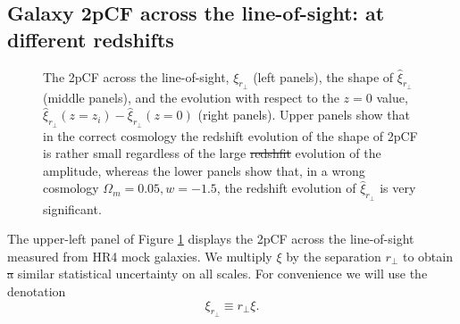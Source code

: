 \documentclass[iop]{emulateapj}
\providecommand{\DIFadd}[1]{{\protect\color{blue}\uwave{#1}}} %
\providecommand{\DIFdel}[1]{{\protect\color{red}\sout{#1}}}                      %
\providecommand{\DIFdelbegin}{} %
\providecommand{\DIFdelend}{} %
\providecommand{\DIFaddFL}[1]{\DIFadd{#1}} %
\providecommand{\DIFdelFL}[1]{\DIFdel{#1}} %
\providecommand{\DIFaddbeginFL}{} %
\providecommand{\DIFaddendFL}{} %
\providecommand{\DIFdelbeginFL}{} %
\providecommand{\DIFdelendFL}{} %
\begin{document}
\subsection{Galaxy 2pCF across the line-of-sight: at different redshifts}\label{sec_2pCF_diffz}

\begin{figure}
   \caption{\label{fig_diffz}
  The 2pCF across the line-of-sight, $\xi_{r_\perp}$ (left panels), the shape of $\hat{\xi}_{r_\perp}$ (middle panels),
  and the evolution with respect to the $z=0$ value, $\hat{\xi}_{r_{\perp}}(z=z_i) - \hat{\xi}_{r_{\perp}}(z=0)$ (right panels). 
  Upper panels show that in the correct cosmology the redshift evolution of the shape of 2pCF is rather small regardless of the large \DIFdelbeginFL \DIFdelFL{redshfit }\DIFdelendFL \DIFaddbeginFL \DIFaddFL{redshift }\DIFaddendFL evolution of the amplitude, 
  whereas the lower panels show that, in a wrong cosmology $\Omega_m = 0.05,w=-1.5$, the redshift evolution of $\hat{\xi}_{r_\perp}$ is very significant.
   }
\end{figure}

The upper-left panel of Figure \ref{fig_diffz} displays the 2pCF across the line-of-sight measured from HR4 mock galaxies. %
We multiply $\xi$ by the separation $r_\perp$ to obtain \DIFdelbegin \DIFdel{a }\DIFdelend similar statistical uncertainty on all scales.
For convenience we will use the denotation
\begin{equation}
 \xi_{r_{\perp}} \equiv r_{\perp} \xi.
\end{equation}
\end{document}
